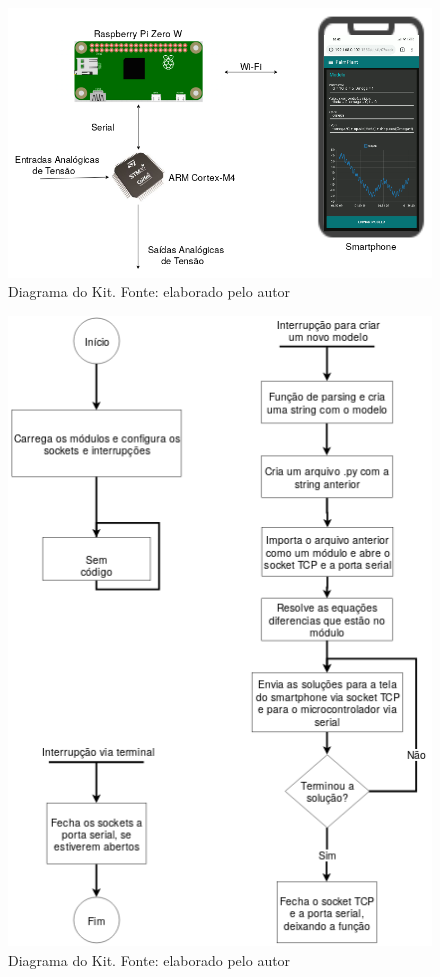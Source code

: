 \documentclass[journal]{IEEEtranTIE}
\begin{document}
\begin{figure}[H]
	\includegraphics[width=\linewidth]{img/diagrama.png}
    \caption{Diagrama do Kit. Fonte: elaborado pelo autor}
    \label{fig:real}
\end{figure}


\begin{figure}[H]
	\includegraphics[width=\linewidth]{img/software.png}
    \caption{Diagrama do Kit. Fonte: elaborado pelo autor}
    \label{fig:real}
\end{figure}
\end{document}
